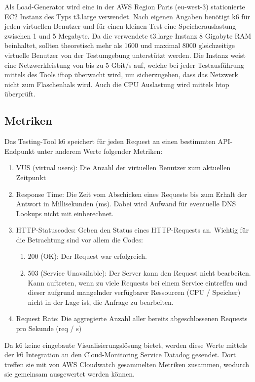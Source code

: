 Als Load-Generator wird eine in der AWS Region Paris (eu-west-3) stationierte EC2 Instanz des Typs t3.large verwendet.
Nach eigenen Angaben benötigt k6 für jeden virtuellen Benutzer und für einen kleinen Test eine Speicherauslastung zwischen 1 und 5 Megabyte\cite{noauthor_running_nodate}. Da die verwendete t3.large Instanz 8 Gigabyte RAM beinhaltet, sollten theoretisch mehr als 1600 und maximal 8000 gleichzeitige virtuelle Benutzer von der Testumgebung unterstützt werden. Die Instanz weist eine Netzwerkleistung von bis zu 5 Gbit/s auf, welche bei jeder Testausführung mittels des Tools iftop überwacht wird, um sicherzugehen, dass das Netzwerk nicht zum Flaschenhals wird. Auch die CPU Auslastung wird mittels htop überprüft.

\subsection{Metriken}
Das Testing-Tool k6 speichert für jeden Request an einen bestimmten API-Endpunkt unter anderem Werte folgender Metriken:
\begin{enumerate}
    \item VUS (virtual users): Die Anzahl der virtuellen Benutzer zum aktuellen Zeitpunkt 
    
    \item Response Time: Die Zeit vom Abschicken eines Requests bis zum Erhalt der Antwort in Millisekunden (ms). Dabei wird Aufwand für eventuelle DNS Lookups nicht mit einberechnet. 
    
    \item HTTP-Statuscodes: Geben den Status eines HTTP-Requests an. Wichtig für die Betrachtung sind vor allem die Codes:
        \begin{enumerate}
            \item 200 (OK): Der Request war erfolgreich.
            \item 503 (Service Unavailable): Der Server kann den Request nicht bearbeiten. Kann auftreten, wenn zu viele Requests bei einem Service eintreffen und dieser aufgrund mangelnder verfügbarer Ressourcen (CPU / Speicher) nicht in der Lage ist, die Anfrage zu bearbeiten.
        \end{enumerate}
        
    \item Request Rate: Die aggregierte Anzahl aller bereits abgeschlossenen Requests pro Sekunde (req / s)
\end{enumerate}

Da k6 keine eingebaute Visualisierungslösung bietet, werden diese Werte mittels der k6 Integration an den Cloud-Monitoring Service Datadog gesendet. Dort treffen sie mit von AWS Cloudwatch gesammelten Metriken zusammen, wodurch sie gemeinsam ausgewertet werden können.


